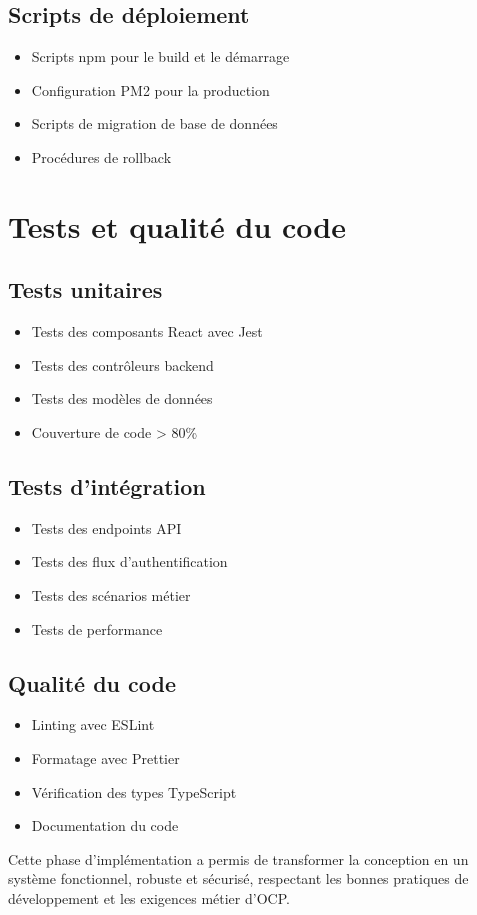 \subsection{Scripts de déploiement}
\begin{itemize}
    \item Scripts npm pour le build et le démarrage
    \item Configuration PM2 pour la production
    \item Scripts de migration de base de données
    \item Procédures de rollback
\end{itemize}

\section{Tests et qualité du code}
\subsection{Tests unitaires}
\begin{itemize}
    \item Tests des composants React avec Jest
    \item Tests des contrôleurs backend
    \item Tests des modèles de données
    \item Couverture de code > 80\%
\end{itemize}

\subsection{Tests d'intégration}
\begin{itemize}
    \item Tests des endpoints API
    \item Tests des flux d'authentification
    \item Tests des scénarios métier
    \item Tests de performance
\end{itemize}

\subsection{Qualité du code}
\begin{itemize}
    \item Linting avec ESLint
    \item Formatage avec Prettier
    \item Vérification des types TypeScript
    \item Documentation du code
\end{itemize}

Cette phase d'implémentation a permis de transformer la conception en un système fonctionnel, robuste et sécurisé, respectant les bonnes pratiques de développement et les exigences métier d'OCP.
